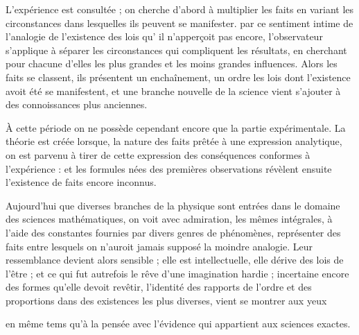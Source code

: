 \documentclass[11pt,a4paper]{article}
\begin{document}
L'expérience est consultée ; on cherche d'abord à multiplier les faits en
variant les circonstances dans lesquelles ils peuvent se manifester.
 par ce sentiment intime de l'analogie de l'existence des
lois qu' il n'apperçoit pas encore, 
l'observateur s'applique à
séparer les circonstances qui compliquent les résultats, en cherchant pour
chacune d'elles les plus grandes et les moins grandes influences. Alors les
faits se classent, ils présentent un enchaînement, un ordre  les lois  dont l'existence avoit été
 se manifestent, et une branche nouvelle de la science
vient s'ajouter à des connoissances plus anciennes.

À cette période on ne possède cependant encore que la partie \struck{\ill{}} expérimentale. La
théorie est créée lorsque, la nature des faits  prêtée à une
expression analytique, on est parvenu à tirer de cette expression des
conséquences conformes à l'expérience :   et les formules nées des premières observations
 révèlent ensuite l'existence de faits encore inconnus.

Aujourd'hui \struck{\ill{}} que diverses branches de la physique sont
entrées dans le domaine des sciences mathématiques, on voit avec admiration, les mêmes intégrales,
 à l'aide des constantes fournies par divers genres de
phénomènes, représenter des faits entre lesquels on n'auroit jamais supposé
la moindre analogie. Leur ressemblance devient alors sensible ; elle est
intellectuelle, elle dérive des lois de l'être ; et  ce qui fut
autrefois le rêve d'une imagination hardie ; incertaine encore des formes
qu'elle devoit revêtir, l'identité des rapports de l'ordre et des
proportions dans des existences les plus diverses, vient se montrer aux yeux

en même tems qu'à la pensée avec l'évidence qui appartient aux sciences
exactes.
\end{document}
